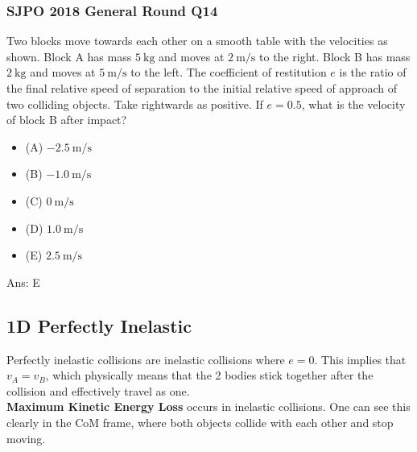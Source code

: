 \documentclass{article}
\begin{document}
\subsubsection{SJPO 2018 General Round Q14}
Two blocks move towards each other on a smooth table with the velocities as shown. Block A has mass $5 \mathrm{~kg}$ and moves at $2 \mathrm{~m} / \mathrm{s}$ to the right. Block B has mass $2 \mathrm{~kg}$ and moves at $5 \mathrm{~m} / \mathrm{s}$ to the left. The coefficient of restitution $e$ is the ratio of the final relative speed of separation to the initial relative speed of approach of two colliding objects. Take rightwards as positive. If $e=0.5$, what is the velocity of block B after impact?
\begin{itemize}
\item[] (A) $-2.5 \mathrm{~m} / \mathrm{s}$
\item[] (B) $-1.0 \mathrm{~m} / \mathrm{s}$
\item[] (C) $0 \mathrm{~m} / \mathrm{s}$
\item[] (D) $ 1.0 \mathrm{~m} / \mathrm{s}$
\item[] (E) $ 2.5 \mathrm{~m} / \mathrm{s}$
\end{itemize}
Ans: \ifpaper E \fi
\subsection{1D Perfectly Inelastic}
Perfectly inelastic collisions are inelastic collisions where $e=0$. This implies that $v_A = v_B$, which physically means that the 2 bodies stick together after the collision and effectively travel as one. \\[10pt]
\textbf{Maximum Kinetic Energy Loss} occurs in inelastic collisions. One can see this clearly in the CoM frame, where both objects collide with each other and stop moving. 
\end{document}
